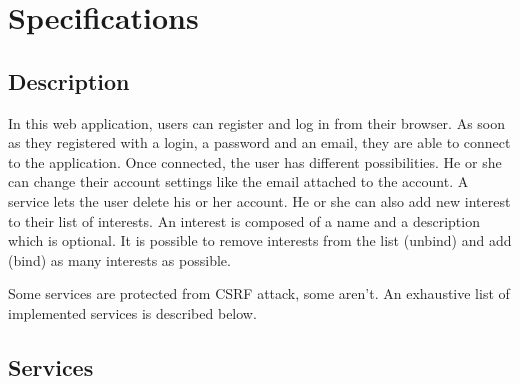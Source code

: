 \documentclass[a4paper,11pt,openany]{report}
\begin{document}
\section{Specifications}

\subsection{Description}

In this web application, users can register and log in from their browser. As soon as 
they registered with a login, a password and an email, they are able to connect to 
the application. Once connected, the user has different possibilities. He or she can 
change their account settings like the email attached to the account. A service lets the 
user delete his or her account. He or she can also add new interest to their list of 
interests. An interest is composed of a name and a description which is optional. It is 
possible to remove interests from the list (unbind) and add (bind) as many interests as 
possible.

Some services are protected from CSRF attack, some aren't. An exhaustive list of implemented 
services is described below.

\subsection{Services}
\end{document}
